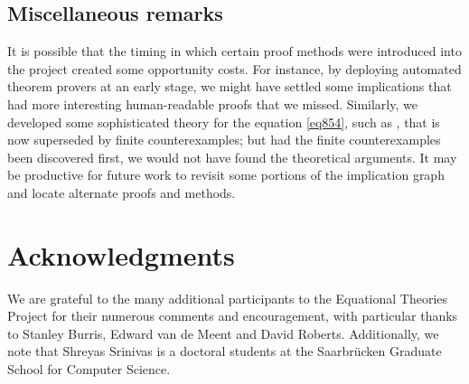 \subsection{Miscellaneous remarks}

It is possible that the timing in which certain proof methods were introduced into the project created some opportunity costs.  For instance, by deploying automated theorem provers at an early stage, we might have settled some implications that had more interesting human-readable proofs that we missed.  Similarly, we developed some sophisticated theory for the equation \eqref{eq854}, such as , that is now superseded by finite counterexamples; but had the finite counterexamples been discovered first, we would not have found the theoretical arguments.  It may be productive for future work to revisit some portions of the implication graph and locate alternate proofs and methods.


\section*{Acknowledgments}

We are grateful to the many additional participants to the Equational Theories Project for their
numerous comments and encouragement, with particular thanks to  Stanley Burris, Edward van de Meent and David Roberts. Additionally, we note that Shreyas Srinivas is a doctoral students at the Saarbr\"{u}cken Graduate School for Computer Science.
